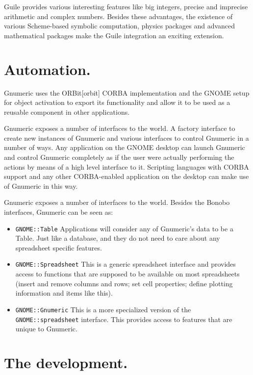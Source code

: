 \documentclass[12pt,twoside,twocolumn]{article}
\begin{document}
Guile provides various interesting features like big integers, precise
and imprecise arithmetic and complex numbers.  Besides these
advantages, the existence of various Scheme-based symbolic
computation, physics packages and advanced mathematical packages make
the Guile integration an exciting extension. 

\section{Automation.}

Gnumeric uses the ORBit[orbit] CORBA implementation and the GNOME
setup for object activation to export its functionality and allow it
to be used as a reusable component in other applications.

Gnumeric exposes a number of interfaces to the world.  A factory
interface to create new instances of Gnumeric and various interfaces
to control Gnumeric in a number of ways.  Any application on the GNOME
desktop can launch Gnumeric and control Gnumeric completely as if the
user were actually performing the actions by means of a high level
interface to it.  Scripting languages with CORBA support and any other
CORBA-enabled application on the desktop can make use of Gnumeric in
this way. 

Gnumeric exposes a number of interfaces to the world.  Besides the
Bonobo interfaces, Gnumeric can be seen as:

\begin{itemize}

	\item {\tt GNOME::Table}  Applications will consider any of
	Gnumeric's data to be a Table.  Just like a database, and they
	do not need to care about any spreadsheet specific features.

	\item {\tt GNOME::Spreadsheet}  This is a generic spreadsheet
	interface and provides access to functions that are supposed
	to be available on most spreadsheets (insert and remove
	columns and rows; set cell properties;  define plotting
	information and items like this).

	\item {\tt GNOME::Gnumeric}  This is a more specialized
	version of the {\tt GNOME::spreadsheet} interface.  This
	provides access to features that are unique to Gnumeric.

\end{itemize}

\section{The development.}
\end{document}
